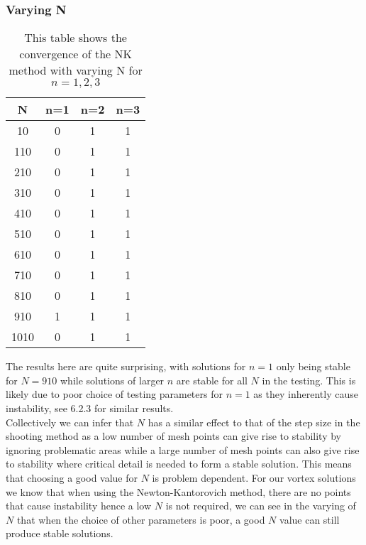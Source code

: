 \documentclass{article}
\begin{document}
\subsubsection{Varying N}
\begin{table}[H]
\centering
\begin{tabular}{|c|c|c|c|}
\hline
N & n=1 &  n=2 &  n=3 \\
\hline
10   & 0 & 1 & 1\\
110  & 0 & 1 & 1\\
210  & 0 & 1 & 1\\
310  & 0 & 1 & 1\\
410  & 0 & 1 & 1\\
510  & 0 & 1 & 1\\
610  & 0 & 1 & 1\\
710  & 0 & 1 & 1\\
810  & 0 & 1 & 1\\
910  & 1 & 1 & 1\\
1010 & 0 & 1 & 1\\
\hline
\end{tabular}
\caption{This table shows the convergence of the NK method with varying N for $n=1,2,3$}
\end{table}
The results here are quite surprising, with solutions for $n=1$ only being stable for $N=910$ while solutions of larger $n$ are stable for all $N$ in the testing. This is likely due to poor choice of testing parameters for $n=1$ as they inherently cause instability, see 6.2.3 for similar results. \\
Collectively we can infer that $N$ has a similar effect to that of the step size in the shooting method as a low number of mesh points can give rise to stability by ignoring problematic areas while a large number of mesh points can also give rise to stability where critical detail is needed to form a stable solution. This means that choosing a good value for $N$ is problem dependent. For our vortex solutions we know that when using the Newton-Kantorovich method, there are no points that cause instability hence a low $N$ is not required, we can see in the varying of $N$ that when the choice of other parameters is poor, a good $N$ value can still produce stable solutions. 
\end{document}
